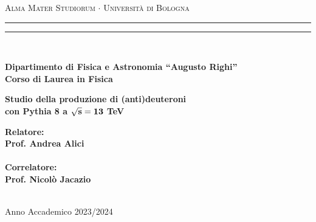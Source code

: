 \thispagestyle{empty}
\textwidth=450pt\oddsidemargin=0pt

\begin{titlepage}

\begin{center}
{{\Large{\textsc{Alma Mater Studiorum $\cdot$ Universit\`a di Bologna}}}} 
\rule[0.1cm]{15.8cm}{0.1mm}
\rule[0.5cm]{15.8cm}{0.6mm}
\\\vspace{3mm}

{\small{\bf Dipartimento di Fisica e Astronomia “Augusto Righi”\\
Corso di Laurea in Fisica}}

\end{center}

\vspace{23mm}

\begin{center}
{\LARGE{\bf Studio della produzione di (anti)deuteroni \\con Pythia 8 a $\bf{\sqrt{s} = 13}$ TeV}}\\
\end{center}

\vspace{50mm} \par \noindent

\begin{minipage}[t]{0.47\textwidth}

{\large{\bf Relatore: \vspace{2mm}\\
Prof. Andrea Alici\\\\

\bf Correlatore:
\vspace{2mm}\\
Prof. Nicolò Jacazio\\\\}}
\end{minipage}
%
\hfill
%
\begin{minipage}[t]{0.47\textwidth}
\end{minipage}

\vspace{40mm}

\begin{center}
Anno Accademico 2023/2024
\end{center}

\end{titlepage}

\restoregeometry %